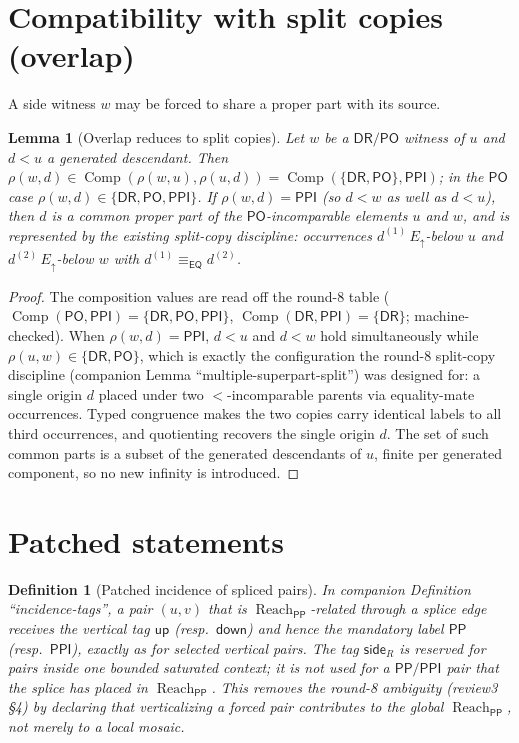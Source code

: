 \documentclass[11pt]{article}
\newtheorem{lemma}[theorem]{Lemma}
\newtheorem{definition}[theorem]{Definition}
\newcommand{\EQ}{\mathsf{EQ}}
\newcommand{\DR}{\mathsf{DR}}
\newcommand{\PO}{\mathsf{PO}}
\newcommand{\PP}{\mathsf{PP}}
\newcommand{\PPI}{\mathsf{PPI}}
\newcommand{\comp}{\operatorname{Comp}}
\newcommand{\reach}{\operatorname{Reach}}
\newcommand{\Eup}{E_{\uparrow}}
\newcommand{\eqc}{\equiv_{\EQ}}
\newcommand{\up}{\mathsf{up}}
\newcommand{\down}{\mathsf{down}}
\newcommand{\sidetag}{\mathsf{side}}
\begin{document}
\section{Compatibility with split copies (overlap)}

A side witness $w$ may be forced to share a proper part with its source.

\begin{lemma}[Overlap reduces to split copies]\label{lem:overlap}
Let $w$ be a $\DR/\PO$ witness of $u$ and $d<u$ a generated descendant.  Then
$\rho(w,d)\in\comp(\rho(w,u),\rho(u,d))=\comp(\{\DR,\PO\},\PPI)$; in the $\PO$
case $\rho(w,d)\in\{\DR,\PO,\PPI\}$.  If $\rho(w,d)=\PPI$ (so $d<w$ as well as
$d<u$), then $d$ is a common proper part of the $\PO$-incomparable elements $u$
and $w$, and is represented by the existing split-copy discipline: occurrences
$d^{(1)}\,\Eup$-below $u$ and $d^{(2)}\,\Eup$-below $w$ with $d^{(1)}\eqc
d^{(2)}$.
\end{lemma}

\begin{proof}
The composition values are read off the round-8 table ($\comp(\PO,\PPI)=
\{\DR,\PO,\PPI\}$, $\comp(\DR,\PPI)=\{\DR\}$; machine-checked).  When
$\rho(w,d)=\PPI$, $d<u$ and $d<w$ hold simultaneously while $\rho(u,w)\in\{\DR,
\PO\}$, which is exactly the configuration the round-8 split-copy discipline
(companion Lemma ``multiple-superpart-split'') was designed for: a single origin
$d$ placed under two $<$-incomparable parents via equality-mate occurrences.
Typed congruence makes the two copies carry identical labels to all third
occurrences, and quotienting recovers the single origin $d$.  The set of such
common parts is a subset of the generated descendants of $u$, finite per
generated component, so no new infinity is introduced.
\end{proof}

\section{Patched statements}

\begin{definition}[Patched incidence of spliced pairs]\label{def:patched-tags}
In companion Definition ``incidence-tags'', a pair $(u,v)$ that is
$\reach_\PP$-related \emph{through a splice edge} receives the vertical tag
$\up$ (resp.\ $\down$) and hence the mandatory label $\PP$ (resp.\ $\PPI$),
exactly as for selected vertical pairs.  The tag $\sidetag_R$ is reserved for
pairs inside one bounded saturated context; it is \emph{not} used for a
$\PP/\PPI$ pair that the splice has placed in $\reach_\PP$.  This removes the
round-8 ambiguity (review3 \S4) by declaring that verticalizing a forced pair
contributes to the global $\reach_\PP$, not merely to a local mosaic.
\end{definition}
\end{document}
